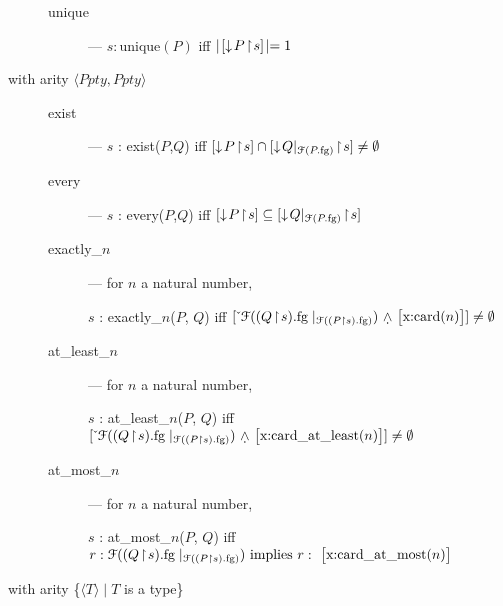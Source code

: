 \begin{description}
\begin{description}
    \item[\textnormal{unique}] --- $s:\textrm{unique}(P)$ iff
      $\mid\![\downarrow\!P\!\restriction\!s]\!\mid = 1$

    \end{description}
    

  
\item[with arity \textnormal{$\langle\textit{Ppty},\textit{Ppty}\rangle$}] \mbox{}

  \begin{description}
    
  \item[\textnormal{exist}] --- %
    $s$ : exist($P$,$Q$) iff
    $[\downarrow\!P\!\restriction\!s]\cap[\downarrow\!Q|_{\mathcal{F}(P.\mathrm{fg})}\!\restriction\!s]\not=\emptyset$
    
  \item[\textnormal{every}] --- $s$ : every($P$,$Q$) iff
    $[\downarrow\!P\!\restriction\!s]\subseteq[\downarrow\!Q|_{\mathcal{F}(P.\mathrm{fg})}\!\restriction\!s]$

    
  \item[\textnormal{exactly\_$n$}] --- for $n$ a natural number,

    $s$ : exactly\_$n$($P$, $Q$) iff
          $\down{\mathcal{F}((Q\!\restriction\!        s).\text{fg}\mid_{\mathcal{F}((P\restriction s).\text{fg})})
        \text{ \d{$\wedge$} \smallrecord{\smalltfield{x}{card($n$)}}}}
      \not=\emptyset$

      
    \item[\textnormal{at\_least\_$n$}] --- for $n$ a natural
      number,

      $s$ : at\_least\_$n$($P$, $Q$) iff
          $\down{\mathcal{F}((Q\!\restriction\!        s).\text{fg}\mid_{\mathcal{F}((P\restriction s).\text{fg})})
        \text{ \d{$\wedge$} \smallrecord{\smalltfield{x}{card\_at\_least($n$)}}}}
      \not=\emptyset$

      
    \item[\textnormal{at\_most\_$n$}] --- for $n$ a natural
      number,

      $s$ : at\_most\_$n$($P$, $Q$) iff
          $r:\mathcal{F}((Q\!\restriction\!        s).\text{fg}\mid_{\mathcal{F}((P\restriction s).\text{fg})})
        \text{ implies } r:\text{ \smallrecord{\smalltfield{x}{card\_at\_most($n$)}}}$

  \end{description}
\item[with arity \textnormal{\{$\langle T\rangle\mid T$ is a type\}}]
  \mbox{}


\end{description}
